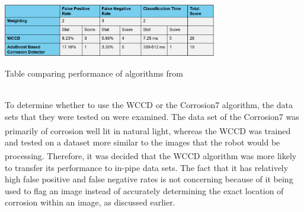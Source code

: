 \documentclass[11pt]{article}		%
\newcommand{\supercite}[1]{\textsuperscript{\cite{#1}}}		%
\begin{document}
			\begin{table}[h]
				\centering
				\includegraphics[width=0.7\textwidth]{WCCD_corrosion_table}
				\caption{Table comparing performance of algorithms from \cite{WCCD}}
				\label{WCCD_comparison}
			\end{table}
		\\
        \hspace*{2ex}To determine whether to use the WCCD or the Corrosion7 algorithm, the data sets that they were tested on were examined. The data set of the Corrosion7 was primarily of corrosion well lit in natural light\supercite{Corrosion7}, whereas the WCCD was trained and tested on a dataset more similar to the images that the robot would be processing\supercite{WCCD}. Therefore, it was decided that the WCCD algorithm was more likely to transfer its performance to in-pipe data sets. The fact that it has relatively high false positive and false negative rates is not concerning because of it being used to flag an image instead of accurately determining the exact location of corrosion within an image, as discussed earlier.
\end{document}
